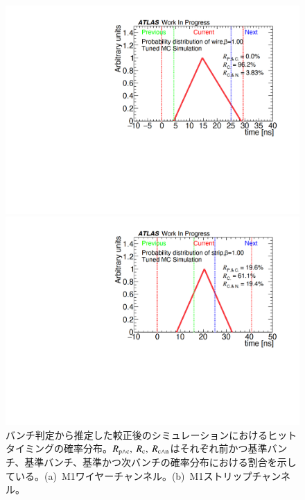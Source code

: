 \begin{figure}[tbp]
    \begin{minipage}{0.49\hsize}
    \centering   
    \includegraphics[width=\textwidth,page=1]{img/rec/rec_tune_w.pdf}
    \subcaption{}
    \end{minipage}
    \begin{minipage}{0.49\hsize}
    \centering   
    \includegraphics[width=\textwidth,page=1]{img/rec/rec_tune_s.pdf}
    \subcaption{}
    \end{minipage}
    \caption[バンチ判定から推定した較正後のシミュレーションにおけるヒットタイミングの確率分布]{バンチ判定から推定した較正後のシミュレーションにおけるヒットタイミングの確率分布。$R_{\rm{p{\land}c}},~R_{\rm{c}},~R_{\rm{c{\land}n}}$はそれぞれ前かつ基準バンチ、基準バンチ、基準かつ次バンチの確率分布における割合を示している。(a)~M1ワイヤーチャンネル。(b)~M1ストリップチャンネル。}\label{fig:rectune}
\end{figure}

